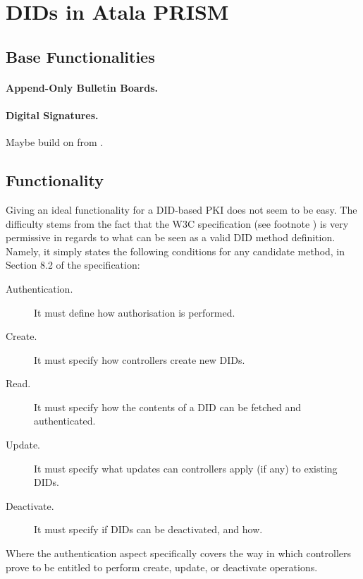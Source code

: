 \section{DIDs in Atala PRISM}
\label{sec:did-atala}

\subsection{Base Functionalities}
\label{ssec:did-funcs}

\paragraph{Append-Only Bulletin Boards.} %

\paragraph{Digital Signatures.} %
Maybe build on \IdealFSig from \cite{canetti03}.

\subsection{Functionality \IdealFPKIDID}

Giving an ideal functionality for a DID-based PKI does not seem to be easy. The
difficulty stems from the fact that the W3C specification (see footnote
) is very permissive in regards to what can be seen as a valid DID
method definition. Namely, it simply states the following conditions for any
candidate method, in Section 8.2 of the specification:

\begin{description}
\item[Authentication.] It must define how authorisation is performed.  
\item[Create.] It must specify how controllers create new DIDs.
\item[Read.] It must specify how the contents of a DID can be fetched and
  authenticated.
\item[Update.] It must specify what updates can controllers apply (if any)
  to existing DIDs.
\item[Deactivate.] It must specify if DIDs can be deactivated, and how.
\end{description}

Where the authentication aspect specifically covers the way in which controllers
prove to be entitled to perform create, update, or deactivate operations.

